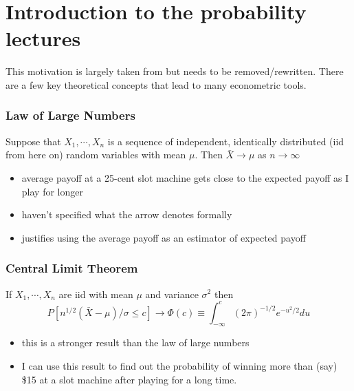 

\part*{Introduction to the probability lectures}%

This motivation is largely taken from \citet{Res_1999} but needs to be
removed/rewritten.  There are a few key theoretical concepts that lead
to many econometric tools.

\section{Law of Large Numbers}

     Suppose that $X_1,\cdots,X_n$ is a sequence of independent,
     identically distributed (iid from here on) random variables with
     mean $\mu$.  Then $\bar X \to \mu$ as $n \to \infty$
\begin{itemize}
\item average payoff at a 25-cent slot machine gets close to the
       expected payoff as I play for longer
\item haven't specified what the arrow denotes formally
\item justifies using the average payoff as an estimator of expected
       payoff
\end{itemize}
\section{Central Limit Theorem}

     If $X_1,\cdots,X_n$ are iid with mean $\mu$ and variance $\sigma$$^2$
     then
     \[ P[n^{1/2}(\bar X - \mu)/\sigma \leq c] \to \Phi(c)
      \equiv \int_{-\infty}^c (2\pi)^{-1/2} e^{-u^2/2} du
     \]
\begin{itemize}
\item this is a stronger result than the law of large numbers
\item I can use this result to find out the probability of winning more
       than (say) \$15 at a slot machine after playing for a long time.
\end{itemize}

